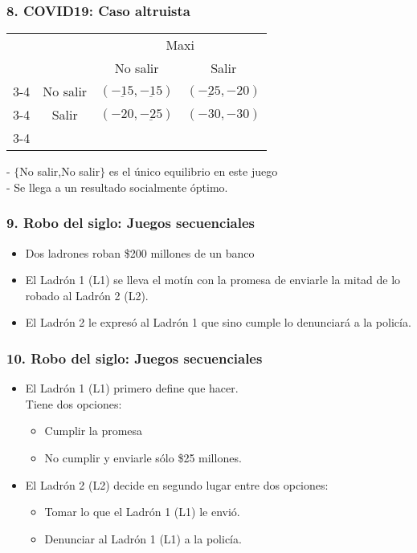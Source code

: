 \documentclass[14pt]{beamer}
\begin{document}
\begin{frame}
\frametitle{8. COVID19: Caso altruista}
\begin{table}
     \begin{tabular}{cc|c|c|}
      & \multicolumn{1}{c}{} & \multicolumn{2}{c}{Maxi}\\
      & \multicolumn{1}{c}{} & \multicolumn{1}{c}{No salir}  & \multicolumn{1}{c}{Salir} \\\cline{3-4}
      \multirow{}{Gaby}  & No salir & $(\underline{-15},\underline{-15})$ & $(\underline{-25},-20)$ \\\cline{3-4}
      & Salir & $(-20,\underline{-25})$ & $(-30,-30)$ \\\cline{3-4}
    \end{tabular}
  \end{table}
    - $\lbrace$No salir,No salir$\rbrace$ es el único equilibrio en este juego \\
  - Se llega a un resultado socialmente óptimo.\\
\end{frame}

\begin{frame}
\frametitle{9. Robo del siglo: Juegos secuenciales}
\begin{itemize}
    \item Dos ladrones roban \$200 millones de un banco
    \item El Ladrón 1 (L1) se lleva el motín con la promesa de enviarle la mitad de lo robado al Ladrón 2 (L2).
    \item El Ladrón 2 le expresó al Ladrón 1 que sino cumple lo denunciará a la policía. 
\end{itemize}
\end{frame}

\begin{frame}
\frametitle{10. Robo del siglo: Juegos secuenciales}
\begin{itemize}
    \item El Ladrón 1 (L1) primero define que hacer. \\ \vspace{2mm} Tiene dos opciones:
    \begin{itemize}
        \item Cumplir la promesa
        \item No cumplir y enviarle sólo \$25 millones.
    \end{itemize}
    \vspace{2mm}
    \item El Ladrón 2 (L2) decide en segundo lugar entre dos opciones: \vspace{2mm}
    \begin{itemize}
        \item Tomar lo que el Ladrón 1 (L1) le envió.
        \item Denunciar al Ladrón 1 (L1) a la policía.
    \end{itemize}
\end{itemize}
\end{frame}
\end{document}
